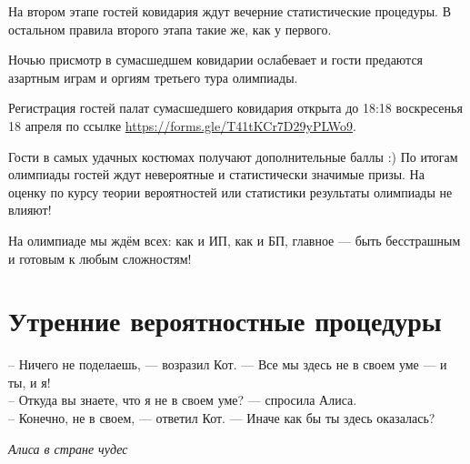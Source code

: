 \documentclass[12pt]{article}
\begin{document}
На втором этапе гостей ковидария ждут вечерние статистические процедуры. В остальном правила второго этапа такие же, как у первого. 

Ночью присмотр в сумасшедшем ковидарии ослабевает и гости предаются азартным играм и оргиям третьего тура олимпиады. 

Регистрация гостей палат сумасшедшего ковидария открыта до 18:18 воскресенья 18 апреля по ссылке \url{https://forms.gle/T41tKCr7D29yPLWo9}.

Гости в самых удачных костюмах получают дополнительные баллы :)
По итогам олимпиады гостей ждут невероятные и статистически значимые призы. На оценку по курсу теории вероятностей или статистики результаты олимпиады не влияют!

На олимпиаде мы ждём всех: как и ИП, как и БП, главное — быть бесстрашным и готовым к любым сложностям!

\newpage
\section*{Утренние вероятностные процедуры}

\epigraph{-- Ничего не поделаешь, — возразил Кот. — Все мы здесь не в своем уме — и ты, и я! \\
-- Откуда вы знаете, что я не в своем уме? — спросила Алиса. \\
-- Конечно, не в своем, — ответил Кот. — Иначе как бы ты здесь оказалась?}{\textit{Алиса в стране чудес}}
\end{document}
